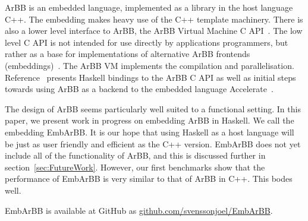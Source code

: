 


 

ArBB is an embedded language, implemented
as a library in the host language C++. The embedding makes 
heavy use of the C++ template machinery. There is also a lower level 
interface to ArBB, the ArBB Virtual Machine C API~\cite{arbbvm}. The low level C API is not
intended for use directly by applications programmers, but rather as a base 
for implementations of alternative ArBB frontends (embeddings)~\cite{ARBB2011}.
The ArBB VM implements the compilation and parallelisation.
Reference~\cite{joelryan} presents Haskell bindings to the ArBB C API as well as initial 
steps towards using ArBB as a backend to the embedded language Accelerate~\cite{ACCELERATEDAMP11}. 

The design of ArBB seems particularly well suited to a functional setting.
In this paper, we present work in progress on embedding ArBB in Haskell. We call the embedding EmbArBB.
It is our hope that using 
Haskell as a host language will be just as user friendly and efficient as 
the C++ version. EmbArBB does not yet include all of the functionality of ArBB,
and this is discussed further in section~\ref{sec:FutureWork}.
However,  our first benchmarks show that the performance of EmbArBB is very similar to that of ArBB in C++. This bodes well. 

EmbArBB is available at GitHub as 
\newline
\url{github.com/svenssonjoel/EmbArBB}.

